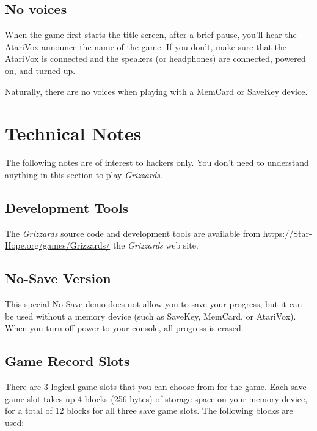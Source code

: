 \documentclass[10pt,twocolumn,openany,article]{memoir}
\begin{document}
\begin{description}
\section{No voices}

When the game first starts the title screen, after a brief pause, you'll
hear the AtariVox announce the name of the game. If you don't, make sure
that  the AtariVox  is connected  and the  speakers (or  headphones) are
connected, powered on, and turned up.

Naturally,  there  are  no  voices   when  playing  with  a  MemCard  or
SaveKey device. 

\fi

\chapter{Technical Notes}

The following notes are of interest to hackers only. You don't need to
understand anything in this section to play \textit{Grizzards}.

\section{Development Tools}

The \textit{Grizzards} source code and development tools are available from
\href{https://Star-Hope.org/games/Grizzards/}{https://Star-Hope\-.org/\-games/\-Grizzards/} 
the \textit{Grizzards} web site.

\ifdefined\NOSAVE

\section{No-Save Version}

This special No-Save demo does not  allow you to save your progress, but
it can  be used without  a memory device  (such as SaveKey,  MemCard, or
AtariVox). When you turn off power to your console, all progress is erased.

\else

\section{Game Record Slots}

There are 3  logical game slots that  you can choose from  for the game.
Each save game  slot takes up 4  blocks (256 bytes) of  storage space on
your memory  device, for a  total of 12 blocks  for all three  save game
slots. The following blocks are used:


\end{description}
\end{document}
